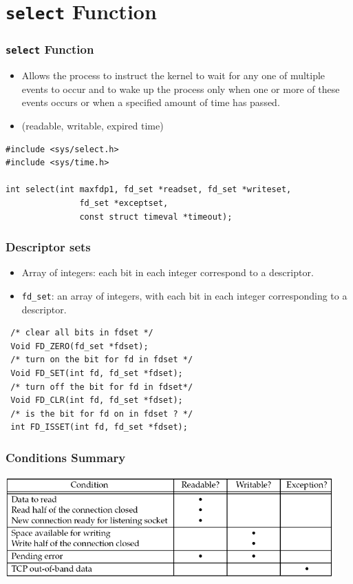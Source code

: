 \documentclass[notes,serif]{beamer}
\begin{document}
\section{\texttt{select} Function}
\begin{frame}[containsverbatim]
\frametitle{\texttt{select} Function}
\begin{itemize}
  \item Allows the process to instruct the kernel to wait for any one of multiple events
  to occur and to wake up the process only when one or more of these events
  occurs or when a specified amount of time has passed.
  \item (readable, writable, expired time)
\end{itemize}
{\scriptsize
  \begin{verbatim}
#include <sys/select.h>
#include <sys/time.h>

int select(int maxfdp1, fd_set *readset, fd_set *writeset,
               fd_set *exceptset,
               const struct timeval *timeout);
  \end{verbatim}
}
\end{frame}

\begin{frame}[containsverbatim]
\frametitle{Descriptor sets}
\begin{itemize}
  \item Array of integers: each bit in each integer correspond to a descriptor.
  \item \texttt{fd\_set}: an array of integers, with each bit in each integer corresponding to a
descriptor.
\end{itemize}
{\scriptsize
\begin{verbatim}
 /* clear all bits in fdset */
 Void FD_ZERO(fd_set *fdset);
 /* turn on the bit for fd in fdset */
 Void FD_SET(int fd, fd_set *fdset);
 /* turn off the bit for fd in fdset*/
 Void FD_CLR(int fd, fd_set *fdset);
 /* is the bit for fd on in fdset ? */
 int FD_ISSET(int fd, fd_set *fdset);
\end{verbatim}
}
\end{frame}

\begin{frame}
\frametitle{Conditions Summary}
  \begin{center}
  \includegraphics[width=.9\textwidth]{figs/06fig07.png}
  \end{center}
\end{frame}
\end{document}
